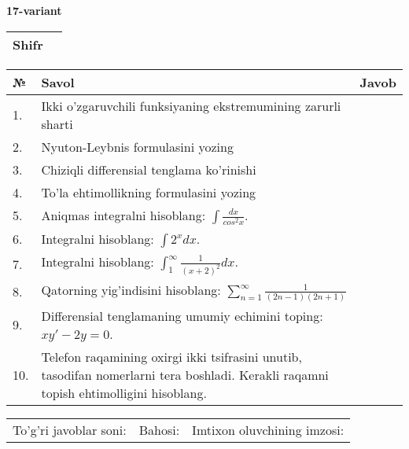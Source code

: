 \documentclass{article}
\begin{document}
  \egroup
  
  \newpage
  
  
  \textbf{17-variant}\\
  
  \bgroup
  \def\arraystretch{1.6} %
  
  \begin{tabular}{|m{5.7cm}|m{9.5cm}|}
  \hline
  Shifr & \\
  \hline
  \end{tabular}
  
  \vspace{1cm}
  
  \begin{tabular}{|m{0.7cm}|m{10cm}|m{4cm}|}
  \hline
  № & Savol & Javob \\
  \hline
  1. & Ikki o'zgaruvchili funksiyaning ekstremumining zarurli sharti &  \\
  \hline
  2. & Nyuton-Leybnis formulasini yozing &  \\
  \hline
  3. & Chiziqli differensial tenglama ko'rinishi &  \\
  \hline
  4. & To'la ehtimollikning formulasini yozing &  \\
  \hline
  5. & Aniqmas integralni hisoblang: \(\int \frac{dx}{cos^{2}x}\). &  \\
  \hline
  6. & Integralni hisoblang: \(\int {2^{x}dx}\). &  \\
  \hline
  7. & Integralni hisoblang: \(\int_{1}^{\infty}{\frac{1}{(x + 2)^{2}}dx}\). &  \\
  \hline
  8. & Qatorning yig'indisini hisoblang: \(\sum_{n = 1}^{\infty}\frac{1}{(2n - 1)(2n + 1)}\) &  \\
  \hline
  9. & Differensial tenglamaning umumiy echimini toping: \(xy' - 2y = 0\). &  \\
  \hline
  10. & Telefon raqamining oxirgi ikki tsifrasini unutib, tasodifan nomerlarni tera boshladi. Kerakli raqamni topish ehtimolligini hisoblang. &  \\
  \hline
  \end{tabular}
  
  \vspace{1cm}
  
  \begin{tabular}{lll}
  To'g'ri javoblar soni: \underline{\hspace{1.5cm}} & 
  Bahosi: \underline{\hspace{1.5cm}} & 
  Imtixon oluvchining imzosi: \underline{\hspace{2cm}} \\
  \end{tabular}
  
\end{document}
